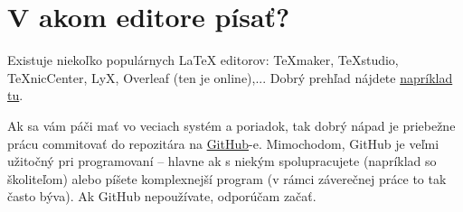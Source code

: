 \chapter{V akom editore písať?}

Existuje niekoľko populárnych LaTeX editorov: TeXmaker, TeXstudio, TeXnicCenter, LyX, Overleaf (ten je online),... Dobrý prehľad nájdete \href{https://beebom.com/best-latex-editors/}{napríklad tu}.

Ak sa vám páči mať vo veciach systém a poriadok, tak dobrý nápad je priebežne prácu commitovať do repozitára na \href{https://github.com/}{GitHub}-e. Mimochodom, GitHub je veľmi užitočný pri programovaní -- hlavne ak s niekým spolupracujete (napríklad so školiteľom) alebo píšete komplexnejší program (v rámci záverečnej práce to tak často býva). Ak GitHub nepoužívate, odporúčam začať. 